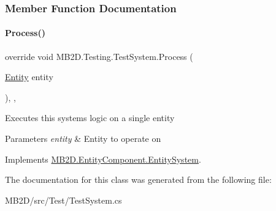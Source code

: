 \subsubsection{Member Function Documentation}
\hypertarget{class_m_b2_d_1_1_testing_1_1_test_system_a35d160e6e7e8ffb8f1a6cf403b00ef40}{}\label{class_m_b2_d_1_1_testing_1_1_test_system_a35d160e6e7e8ffb8f1a6cf403b00ef40} 
\paragraph{\texorpdfstring{Process()}{Process()}}
{\footnotesize\ttfamily override void M\+B2\+D.\+Testing.\+Test\+System.\+Process (\begin{DoxyParamCaption}\item[{\hyperlink{class_m_b2_d_1_1_entity_component_1_1_entity}{Entity}}]{entity }\end{DoxyParamCaption})\hspace{0.3cm}{\ttfamily [inline]}, {\ttfamily [protected]}, {\ttfamily [virtual]}}



Executes this systems logic on a single entity 


\begin{DoxyParams}{Parameters}
{\em entity} & Entity to operate on\\
\hline
\end{DoxyParams}


Implements \hyperlink{class_m_b2_d_1_1_entity_component_1_1_entity_system_abbf83b87cb5d12754fb058cef50451fa}{M\+B2\+D.\+Entity\+Component.\+Entity\+System}.



The documentation for this class was generated from the following file\+:\begin{DoxyCompactItemize}
\item 
M\+B2\+D/src/\+Test/Test\+System.\+cs\end{DoxyCompactItemize}

